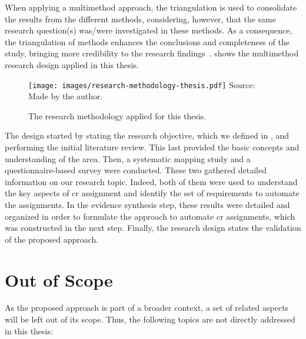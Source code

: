 When applying a multimethod approach, the triangulation is used to consolidate
the results from the different methods, considering, however, that the same
research question(s) was/were investigated in these methods. As a consequence,
the triangulation of methods enhances the conclusions and completeness of the
study, bringing more credibility to the research
findings~\citep{Hesse-Biber2010}.  shows
the multimethod research design applied in this thesis.

\begin{figure}[h]
\centering
  \caption[Research methodology.]{The research methodology applied for this
  thesis.}
  \texttt{[image: images/research-methodology-thesis.pdf]}
  \footnotesize{Source: Made by the author.}
  \label{fig:research-methodology-thesis}
\end{figure}

The design started by stating the research objective, which we defined in
, and performing the initial literature
review. This last provided the basic concepts and understanding of the area.
Then, a systematic mapping study and a questionnaire-based survey were
conducted. These two gathered detailed information on our research topic.
Indeed, both of them were used to understand the key aspects of \ac{cr}
assignment and identify the set of requirements to automate the assignments. In
the evidence synthesis step, these results were detailed and organized in order
to formulate the approach to automate \ac{cr} assignments, which was constructed
in the next step. Finally, the research design states the validation of the
proposed approach.

\section{Out of Scope}

As the proposed approach is part of a broader context, a set of related aspects
will be left out of its scope. Thus, the following topics are not directly
addressed in this thesis:

